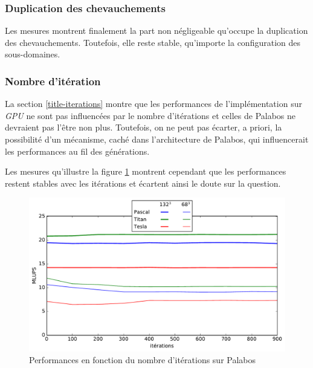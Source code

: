\subsubsection{Duplication des chevauchements}
Les mesures montrent finalement la part non négligeable qu'occupe la duplication des chevauchements. Toutefois, elle reste stable, qu'importe la configuration des sous-domaines.

\subsubsection{Nombre d'itération}\label{title-iterations_palabos}
La section \ref{title-iterations} montre que les performances de l'implémentation sur \textit{GPU} ne sont pas influencées par le nombre d'itérations et celles de Palabos ne devraient pas l'être non plus. Toutefois, on ne peut pas écarter, a priori, la possibilité d'un mécanisme, caché dans l'architecture de Palabos, qui influencerait les performances au fil des générations.

Les mesures qu'illustre la figure \ref{fig:lups_by_iter_palabos} montrent cependant que les performances restent stables avec les itérations et écartent ainsi le doute sur la question.

\begin{figure}[H]
	\centering
	\includegraphics[fbox, scale=0.61]{images/perfs/cavity_benchmark/lups_by_iter.pdf}
	\caption{Performances en fonction du nombre d'itérations sur Palabos}
	\label{fig:lups_by_iter_palabos}
\end{figure}


